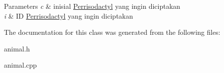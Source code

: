 \begin{DoxyParams}{Parameters}
{\em c} & inisial \hyperlink{classPerrisodactyl}{Perrisodactyl} yang ingin diciptakan \\
\hline
{\em i} & ID \hyperlink{classPerrisodactyl}{Perrisodactyl} yang ingin diciptakan \\
\hline
\end{DoxyParams}


The documentation for this class was generated from the following files\+:\begin{DoxyCompactItemize}
\item 
animal.\+h\item 
animal.\+cpp\end{DoxyCompactItemize}
